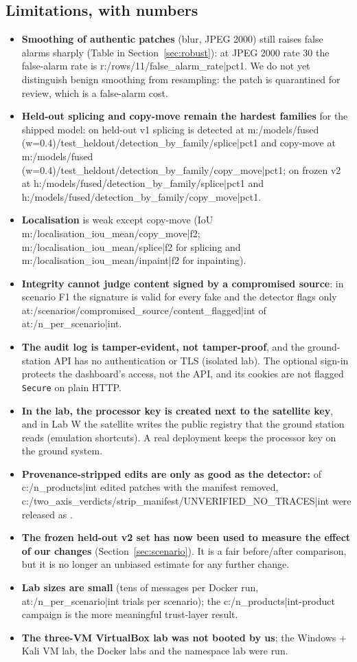 \subsection{Limitations, with numbers}
\begin{itemize}
  \item \textbf{Smoothing of authentic patches} (blur, JPEG 2000) still raises false alarms sharply (Table in Section~\ref{sec:robust}): at JPEG 2000 rate 30 the false-alarm rate is {{r:/rows/11/false_alarm_rate|pct1}}. We do not yet distinguish benign smoothing from resampling: the patch is quarantined for review, which is a false-alarm cost.
  \item \textbf{Held-out splicing and copy-move remain the hardest families} for the shipped model: on held-out v1 splicing is detected at {{m:/models/fused (w=0.4)/test_heldout/detection_by_family/splice|pct1}} and copy-move at {{m:/models/fused (w=0.4)/test_heldout/detection_by_family/copy_move|pct1}}; on frozen v2 at {{h:/models/fused/detection_by_family/splice|pct1}} and {{h:/models/fused/detection_by_family/copy_move|pct1}}.
  \item \textbf{Localisation} is weak except copy-move (IoU {{m:/localisation_iou_mean/copy_move|f2}}; {{m:/localisation_iou_mean/splice|f2}} for splicing and {{m:/localisation_iou_mean/inpaint|f2}} for inpainting).
  \item \textbf{Integrity cannot judge content signed by a compromised source}: in scenario F1 the signature is valid for every fake and the detector flags only {{at:/scenarios/compromised_source/content_flagged|int}} of {{at:/n_per_scenario|int}}.
  \item \textbf{The audit log is tamper-evident, not tamper-proof}, and the ground-station API has no authentication or TLS (isolated lab). The optional sign-in protects the dashboard's access, not the API, and its cookies are not flagged \texttt{Secure} on plain HTTP.
  \item \textbf{In the lab, the processor key is created next to the satellite key}, and in Lab W the satellite writes the public registry that the ground station reads (emulation shortcuts). A real deployment keeps the processor key on the ground system.
  \item \textbf{Provenance-stripped edits are only as good as the detector:} of {{c:/n_products|int}} edited patches with the manifest removed, {{c:/two_axis_verdicts/strip_manifest/UNVERIFIED_NO_TRACES|int}} were released as .
  \item \textbf{The frozen held-out v2 set has now been used to measure the effect of our changes} (Section~\ref{sec:scenario}). It is a fair before/after comparison, but it is no longer an unbiased estimate for any further change.
  \item \textbf{Lab sizes are small} (tens of messages per Docker run, {{at:/n_per_scenario|int}} trials per scenario); the {{c:/n_products|int}}-product campaign is the more meaningful trust-layer result.
  \item \textbf{The three-VM VirtualBox lab was not booted by us}; the Windows + Kali VM lab, the Docker labs and the namespace lab were run.
\end{itemize}
